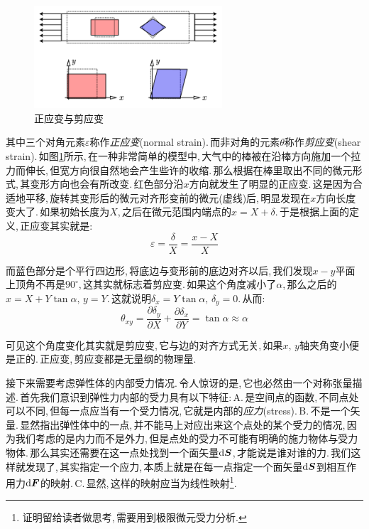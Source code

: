 \begin{figure}
\centering
\includegraphics[width=7cm]{image/6-7-1.png}
\caption{正应变与剪应变}\label{6-7-1}
\end{figure}
其中三个对角元素$\varepsilon$称作\emph{正应变}(normal strain).\,而非对角的元素$\theta$称作\emph{剪应变}(shear strain).\,如图\ref{6-7-1}所示,\,在一种非常简单的模型中,\,大气中的棒被在沿棒方向施加一个拉力而伸长,\,但宽方向很自然地会产生些许的收缩.\,那么根据在棒里取出不同的微元形式,\,其变形方向也会有所改变.\,红色部分沿$x$方向就发生了明显的正应变.\,这是因为合适地平移,\,旋转其变形后的微元对齐形变前的微元(虚线)后,\,明显发现在$x$方向长度变大了.\,如果初始长度为$X$,\,之后在微元范围内端点的$x=X+\delta$.\,于是根据上面的定义,\,正应变其实就是:
\[\varepsilon=\frac{\delta}{X}=\frac{x-X}{X}\]

而蓝色部分是个平行四边形,\,将底边与变形前的底边对齐以后,\,我们发现$x-y$平面上顶角不再是$90^\circ$,\,这其实就标志着剪应变.\,如果这个角度减小了$\alpha$,\,那么之后的$x=X+Y\tan\alpha,\,y=Y$.\,这就说明$\delta_x=Y\tan\alpha,\,\delta_y=0$.\,从而:
\[\theta_{xy}=\frac{\partial \delta_y}{\partial X}+\frac{\partial \delta_x}{\partial Y}=\tan\alpha\approx \alpha\]

可见这个角度变化其实就是剪应变,\,它与边的对齐方式无关,\,如果$x,\,y$轴夹角变小便是正的.\,正应变,\,剪应变都是无量纲的物理量.

\vspace{0.5cm}

接下来需要考虑弹性体的内部受力情况.\,令人惊讶的是,\,它也必然由一个对称张量描述.\,首先我们意识到弹性力内部的受力具有以下特征:\,A.\,是空间点的函数,\,不同点处可以不同,\,但每一点应当有一个受力情况,\,它就是内部的\emph{应力}(stress).\,B.\,不是一个矢量.\,显然指出弹性体中的一点,\,并不能马上对应出来这个点处的某个受力的情况,\,因为我们考虑的是内力而不是外力,\,但是点处的受力不可能有明确的施力物体与受力物体.\,那么其实还需要在这一点处找到一个面矢量$\textrm{d} \boldsymbol{S}$,\,才能说是谁对谁的力.\,我们这样就发现了,\,其实指定一个应力,\,本质上就是在每一点指定一个面矢量$\textrm{d} \boldsymbol{S}$到相互作用力$\textrm{d} \boldsymbol{F}$的映射.\,C.\,显然,\,这样的映射应当为线性映射\footnote{证明留给读者做思考,\,需要用到极限微元受力分析.}.

